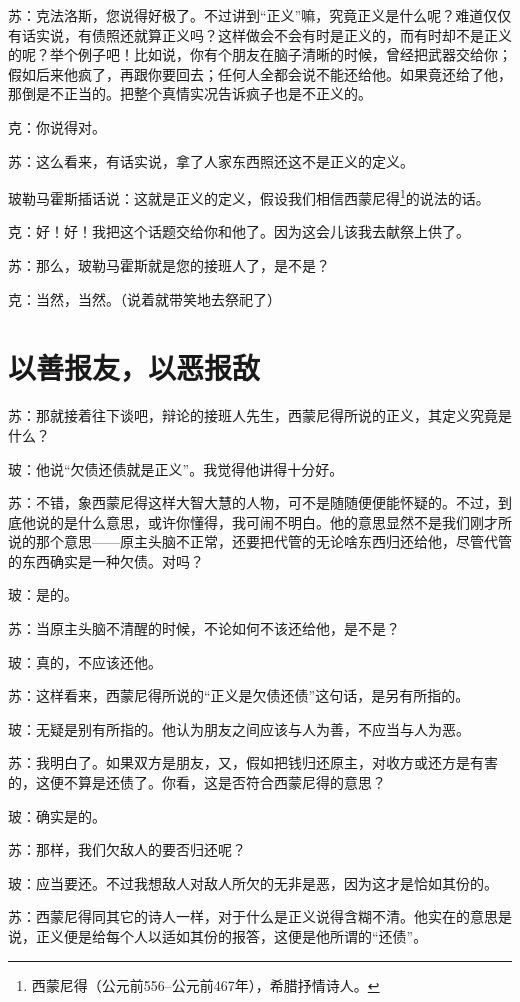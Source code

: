 \documentclass[11pt,oneside]{book}
\begin{document}
\begin{common-format}
苏：克法洛斯，您说得好极了。不过讲到“正义”嘛，究竟正义是什么呢？难道仅仅有话实说，有债照还就算正义吗？这样做会不会有时是正义的，而有时却不是正义的呢？举个例子吧！比如说，你有个朋友在脑子清晰的时候，曾经把武器交给你；假如后来他疯了，再跟你要回去；任何人全都会说不能还给他。如果竟还给了他，那倒是不正当的。把整个真情实况告诉疯子也是不正义的。

克：你说得对。

苏：这么看来，有话实说，拿了人家东西照还这不是正义的定义。

玻勒马霍斯插话说：这就是正义的定义，假设我们相信西蒙尼得\footnote{西蒙尼得（公元前556--公元前467年），希腊抒情诗人。}的说法的话。

克：好！好！我把这个话题交给你和他了。因为这会儿该我去献祭上供了。

苏：那么，玻勒马霍斯就是您的接班人了，是不是？

克：当然，当然。（说着就带笑地去祭祀了）



\section{以善报友，以恶报敌}
苏：那就接着往下谈吧，辩论的接班人先生，西蒙尼得所说的正义，其定义究竟是什么？

玻：他说“欠债还债就是正义”。我觉得他讲得十分好。

苏：不错，象西蒙尼得这样大智大慧的人物，可不是随随便便能怀疑的。不过，到底他说的是什么意思，或许你懂得，我可闹不明白。他的意思显然不是我们刚才所说的那个意思——原主头脑不正常，还要把代管的无论啥东西归还给他，尽管代管的东西确实是一种欠债。对吗？

玻：是的。

苏：当原主头脑不清醒的时候，不论如何不该还给他，是不是？

玻：真的，不应该还他。

苏：这样看来，西蒙尼得所说的“正义是欠债还债”这句话，是另有所指的。

玻：无疑是别有所指的。他认为朋友之间应该与人为善，不应当与人为恶。

苏：我明白了。如果双方是朋友，又，假如把钱归还原主，对收方或还方是有害的，这便不算是还债了。你看，这是否符合西蒙尼得的意思？

玻：确实是的。

苏：那样，我们欠敌人的要否归还呢？

玻：应当要还。不过我想敌人对敌人所欠的无非是恶，因为这才是恰如其份的。

苏：西蒙尼得同其它的诗人一样，对于什么是正义说得含糊不清。他实在的意思是说，正义便是给每个人以适如其份的报答，这便是他所谓的“还债”。


\end{common-format}
\end{document}
